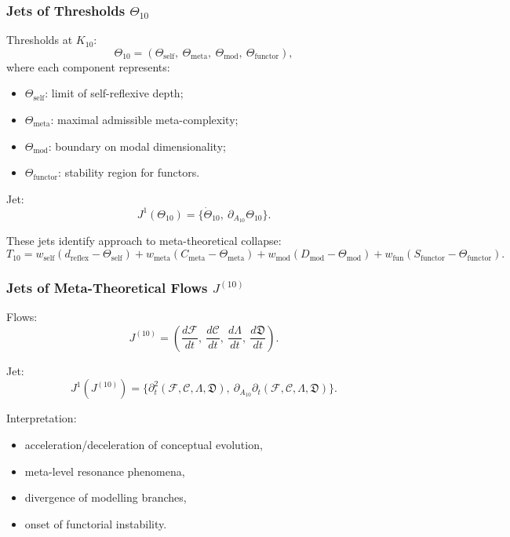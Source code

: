 \subsubsection{Jets of Thresholds $\Theta_{10}$}

Thresholds at $K_{10}$:
\[
\Theta_{10}
=
(\Theta_{\mathrm{self}},\
 \Theta_{\mathrm{meta}},\
 \Theta_{\mathrm{mod}},\
 \Theta_{\mathrm{functor}}),
\]
where each component represents:
\begin{itemize}
    \item $\Theta_{\mathrm{self}}$: limit of self-reflexive depth;
    \item $\Theta_{\mathrm{meta}}$: maximal admissible meta-complexity;
    \item $\Theta_{\mathrm{mod}}$: boundary on modal dimensionality;
    \item $\Theta_{\mathrm{functor}}$: stability region for functors.
\end{itemize}

Jet:
\[
J^1(\Theta_{10})
=
\{\dot{\Theta}_{10},\ \partial_{A_{10}}\Theta_{10}\}.
\]

These jets identify approach to meta-theoretical collapse:
\[
T_{10}
=
w_{\mathrm{self}}(d_{\mathrm{reflex}}-\Theta_{\mathrm{self}})
+
w_{\mathrm{meta}}(C_{\mathrm{meta}}-\Theta_{\mathrm{meta}})
+
w_{\mathrm{mod}}(D_{\mathrm{mod}}-\Theta_{\mathrm{mod}})
+
w_{\mathrm{fun}}(S_{\mathrm{functor}}-\Theta_{\mathrm{functor}}).
\]


\subsubsection{Jets of Meta-Theoretical Flows $J^{(10)}$}

Flows:
\[
J^{(10)}
=
\left(
\frac{d\mathcal{F}}{dt},\
\frac{d\mathcal{C}}{dt},\
\frac{d\Lambda}{dt},\
\frac{d\mathfrak{D}}{dt}
\right).
\]

Jet:
\[
J^1(J^{(10)})=
\Big\{
\partial_t^2(\mathcal{F},\mathcal{C},\Lambda,\mathfrak{D}),\
\partial_{A_{10}}\partial_t(\mathcal{F},\mathcal{C},\Lambda,\mathfrak{D})
\Big\}.
\]

Interpretation:
\begin{itemize}
    \item acceleration/deceleration of conceptual evolution,
    \item meta-level resonance phenomena,
    \item divergence of modelling branches,
    \item onset of functorial instability.
\end{itemize}



